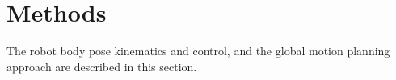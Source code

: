 \section{ Methods }

The robot body pose kinematics and control, and the global motion planning approach are described in this section. 






